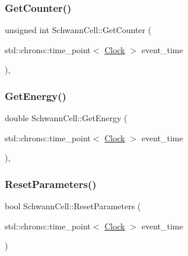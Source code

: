 \subsubsection{\texorpdfstring{Get\+Counter()}{GetCounter()}}
{\footnotesize\ttfamily unsigned int Schwann\+Cell\+::\+Get\+Counter (\begin{DoxyParamCaption}\item[{std\+::chrono\+::time\+\_\+point$<$ \mbox{\hyperlink{universe_8h_a0ef8d951d1ca5ab3cfaf7ab4c7a6fd80}{Clock}} $>$}]{event\+\_\+time }\end{DoxyParamCaption})\hspace{0.3cm}{\ttfamily [inline]}, {\ttfamily [private]}}

\mbox{\label{classSchwannCell_af6dd3963bc46763b34f2ee742a4c9fae}} 
\subsubsection{\texorpdfstring{Get\+Energy()}{GetEnergy()}}
{\footnotesize\ttfamily double Schwann\+Cell\+::\+Get\+Energy (\begin{DoxyParamCaption}\item[{std\+::chrono\+::time\+\_\+point$<$ \mbox{\hyperlink{universe_8h_a0ef8d951d1ca5ab3cfaf7ab4c7a6fd80}{Clock}} $>$}]{event\+\_\+time }\end{DoxyParamCaption})\hspace{0.3cm}{\ttfamily [inline]}, {\ttfamily [private]}}

\mbox{\label{classSchwannCell_af60de27e9658b2ca9973931c2175fe74}} 
\subsubsection{\texorpdfstring{Reset\+Parameters()}{ResetParameters()}}
{\footnotesize\ttfamily bool Schwann\+Cell\+::\+Reset\+Parameters (\begin{DoxyParamCaption}\item[{std\+::chrono\+::time\+\_\+point$<$ \mbox{\hyperlink{universe_8h_a0ef8d951d1ca5ab3cfaf7ab4c7a6fd80}{Clock}} $>$}]{event\+\_\+time }\end{DoxyParamCaption})\hspace{0.3cm}{\ttfamily [private]}}

